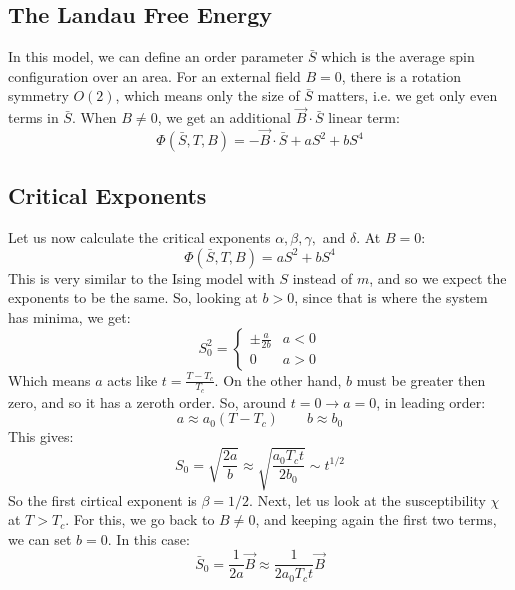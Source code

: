\documentclass{article}
\begin{document}
\subsection{The Landau Free Energy}
In this model, we can define an order parameter $\bar{S}$ which is the average spin configuration over an area. For an external field $B = 0$, there is a rotation symmetry $O(2)$, which means only the size of $\bar{S}$ matters, i.e. we get only even terms in $\bar{S}$. When $B \ne 0$, we get an additional $\vec{B}\cdot\bar{S}$ linear term:
\begin{equation}
    \Phi(\bar{S}, T, B) = -\vec{B}\cdot\bar{S} + aS^2 + bS^4
\end{equation}
\subsection{Critical Exponents}
Let us now calculate the critical exponents $\alpha, \beta, \gamma,$ and $\delta$. At $B = 0$:
\begin{equation}
    \Phi(\bar{S}, T, B) = aS^2 + bS^4
\end{equation}
This is very similar to the Ising model with $S$ instead of $m$, and so we expect the exponents to be the same. So, looking at $b > 0$, since that is where the system has minima, we get:
\begin{equation}
    S_0^2 = \begin{cases}
        \pm \frac{a}{2b} & a < 0 \\
        0 & a > 0
    \end{cases}
\end{equation}
Which means $a$ acts like $t = \frac{T - T_c}{T_c}$. On the other hand, $b$ must be greater then zero, and so it has a zeroth order. So, around $t = 0 \rightarrow a = 0$, in leading order:
\begin{equation}
    a \approx a_0 (T - T_c)
    \qquad
    b \approx b_0
\end{equation}
This gives:
\begin{equation}
    S_0 = \sqrt{\frac{2a}{b}} \approx \sqrt{\frac{a_0T_c t}{2b_0}} \sim t^{1/2}
\end{equation}
So the first cirtical exponent is $\beta = 1/2$. Next, let us look at the susceptibility $\chi$ at $T > T_c$. For this, we go back to $B \ne 0$, and keeping again the first two terms, we can set $b = 0$. In this case:
\begin{equation}
    \bar{S}_0 = \frac{1}{2a}\vec{B} \approx \frac{1}{2a_0T_c t}\vec{B}
\end{equation}
\end{document}
